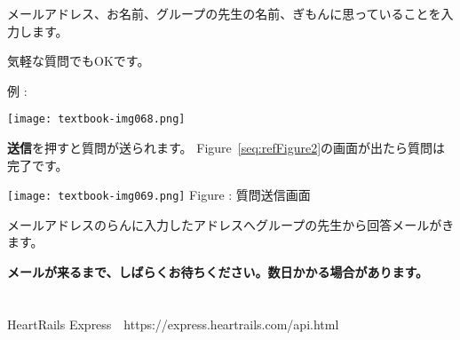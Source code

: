 メールアドレス、お名前、グループの先生の名前、ぎもんに思っていることを入力します。

気軽な質問でもOKです。

例 :

\begin{center}
	\texttt{[image: textbook-img068.png]}
\end{center}

\textbf{送信}を押すと質問が送られます。
Figure~\ref{seq:refFigure2}の画面が出たら質問は完了です。

\begin{center}
\begin{minipage}{0.9\textwidth}
{\upshape \texttt{[image: textbook-img069.png]}
 \newline
Figure {\theFigure\label{seq:refFigure2}}: 質問送信画面}
\end{minipage}
\end{center}
メールアドレスのらんに入力したアドレスへグループの先生から回答メールがきます。

{\bfseries \textmd{メールが来るまで、しばらくお待ちください。数日かかる場合があります。}}

\section{}
HeartRails Express　https://express.heartrails.com/api.html
